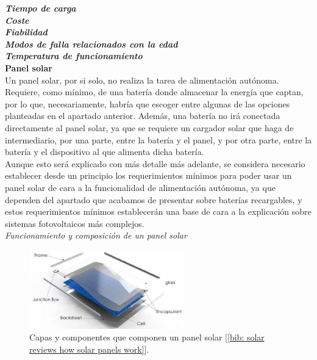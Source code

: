 \documentclass[12pt]{article}
\begin{document}
	\noindent \textit{\textbf{Tiempo de carga}}\\	
	
	\noindent \textit{\textbf{Coste}}\\
	
	\noindent \textit{\textbf{Fiabilidad}}\\		
	
	\noindent \textit{\textbf{Modos de falla relacionados con la edad}}\\	
	
	\noindent \textit{\textbf{Temperatura de funcionamiento}}\\	
	
	\noindent \textbf{Panel solar}\\ 
	
	\noindent Un panel solar, por si solo, no realiza la tarea de alimentación autónoma. Requiere, como mínimo, de una batería donde almacenar la energía que captan, por lo que, necesariamente, habría que escoger entre algunas de las opciones planteadas en el apartado anterior. Además, una batería no irá conectada directamente al panel solar, ya que se requiere un cargador solar que haga de intermediario, por una parte, entre la batería y el panel, y por otra parte, entre la batería y el dispositivo al que alimenta dicha batería. \\
	
	\noindent Aunque esto será explicado con más detalle más adelante, se considera necesario establecer desde un principio los requerimientos mínimos para poder usar un panel solar de cara a la funcionalidad de alimentación autónoma, ya que dependen del apartado que acabamos de presentar sobre baterías recargables, y estos requerimientos mínimos establecerán una base de cara a la explicación sobre sistemas fotovoltaicos más complejos. \\
	
	\noindent \textit{Funcionamiento y composición de un panel solar}
	
	\begin{figure}[h]
		\begin{center}
			\includegraphics[width=0.6\textwidth]{img/layersSolarPanel.png}
			\caption{Capas y componentes que componen un panel solar [\ref{bib: solar reviews how solar panels work}].}
			\label{fig: capas panel solar}
		\end{center}
	\end{figure}
\end{document}

